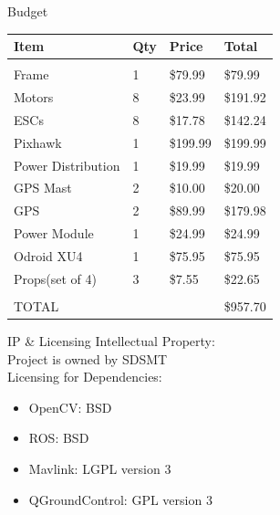 \documentclass[11pt]{beamer}
\begin{document}
\begin{frame}{Budget}
\begin{table}[]
\centering
\begin{tabular}{|l|l|l|l|}
\hline
Item               & Qty & Price    & Total    \\ \hline
                   &     &          &          \\ \hline
Frame              & 1   & \$79.99  & \$79.99  \\ \hline
Motors             & 8   & \$23.99  & \$191.92 \\ \hline
ESCs               & 8   & \$17.78  & \$142.24 \\ \hline
Pixhawk            & 1   & \$199.99 & \$199.99 \\ \hline
Power Distribution & 1   & \$19.99  & \$19.99  \\ \hline
GPS Mast           & 2   & \$10.00  & \$20.00  \\ \hline
GPS                & 2   & \$89.99  & \$179.98 \\ \hline
Power Module       & 1   & \$24.99  & \$24.99  \\ \hline
Odroid XU4         & 1   & \$75.95  & \$75.95  \\ \hline
Props(set of 4)    & 3   & \$7.55   & \$22.65  \\ \hline
                   &     &          &          \\ \hline
TOTAL              &     &          & \$957.70 \\ \hline
\end{tabular}
\end{table}


\end{frame}


\begin{frame}{IP \& Licensing}
Intellectual Property:\\
Project is owned by SDSMT\\
\vspace{4mm}
Licensing for Dependencies:
\begin{itemize}
\item OpenCV: BSD 
\item ROS: BSD
\item Mavlink: LGPL version 3
\item QGroundControl: GPL version 3
\end{itemize}


\end{frame}

\end{document}

